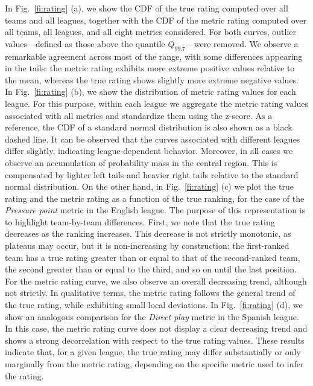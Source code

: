\documentclass[preprint, amsmath,amssymb, pre]{revtex4-2}
\begin{document}
In Fig.~\ref{fi:rating} (a), we show the CDF of the true rating computed over all teams and all leagues, together with the CDF of the metric rating computed over all teams, all leagues, and all eight metrics considered. For both curves, outlier values—defined as those above the quantile $Q_{99.7}$—were removed.
%
We observe a remarkable agreement across most of the range, with some differences appearing in the tails: the metric rating exhibits more extreme positive values relative to the mean, whereas the true rating shows slightly more extreme negative values.
%
In Fig.~\ref{fi:rating} (b), we show the distribution of metric rating values for each league. For this purpose, within each league we aggregate the metric rating values associated with all metrics and standardize them using the z-score.
%
As a reference, the CDF of a standard normal distribution is also shown as a black dashed line.
It can be observed that the curves associated with different leagues differ slightly, indicating league-dependent behavior. Moreover, in all cases we observe an accumulation of probability mass in the central region. This is compensated by lighter left tails and heavier right tails relative to the standard normal distribution.
%
On the other hand, in Fig.~\ref{fi:rating} (c) we plot the true rating and the metric rating as a function of the true ranking, for the case of the {\it Pressure point} metric in the English league. The purpose of this representation is to highlight team-by-team differences.
%
First, we note that the true rating decreases as the ranking increases. This decrease is not strictly monotonic, as plateaus may occur, but it is non-increasing by construction: the first-ranked team has a true rating greater than or equal to that of the second-ranked team, the second greater than or equal to the third, and so on until the last position.
%
For the metric rating curve, we also observe an overall decreasing trend, although not strictly. In qualitative terms, the metric rating follows the general trend of the true rating, while exhibiting small local deviations.
%
In Fig.~\ref{fi:rating} (d), we show an analogous comparison for the {\it Direct play} metric in the Spanish league. In this case, the metric rating curve does not display a clear decreasing trend and shows a strong decorrelation with respect to the true rating values.
%
These results indicate that, for a given league, the true rating may differ substantially or only marginally from the metric rating, depending on the specific metric used to infer the rating.
\end{document}
